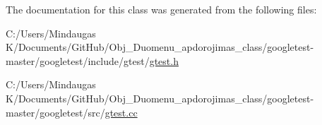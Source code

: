 The documentation for this class was generated from the following files\+:\begin{DoxyCompactItemize}
\item 
C\+:/\+Users/\+Mindaugas K/\+Documents/\+Git\+Hub/\+Obj\+\_\+\+Duomenu\+\_\+apdorojimas\+\_\+class/googletest-\/master/googletest/include/gtest/\mbox{\hyperlink{googletest-master_2googletest_2include_2gtest_2gtest_8h}{gtest.\+h}}\item 
C\+:/\+Users/\+Mindaugas K/\+Documents/\+Git\+Hub/\+Obj\+\_\+\+Duomenu\+\_\+apdorojimas\+\_\+class/googletest-\/master/googletest/src/\mbox{\hyperlink{googletest-master_2googletest_2src_2gtest_8cc}{gtest.\+cc}}\end{DoxyCompactItemize}
